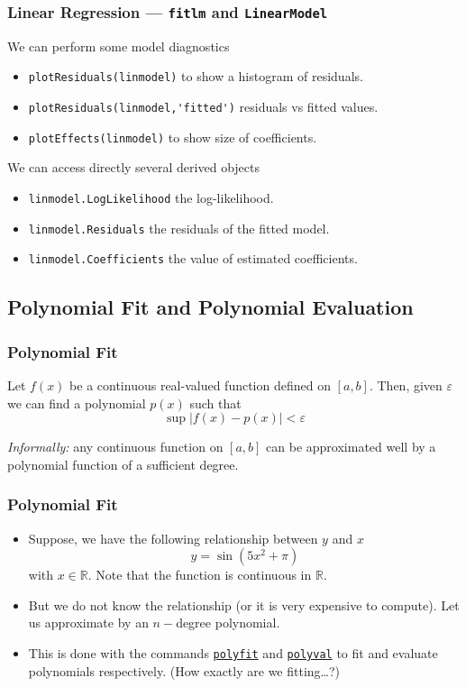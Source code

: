 \documentclass[11pt,xcolor={svgnames},aspectratio=169,usepdftitle=false]{beamer}
\begin{document}
\begin{frame}[fragile]
  \frametitle{Linear Regression --- \texttt{fitlm} and \texttt{LinearModel}}
We can perform some model diagnostics
\begin{itemize}
  \item \verb;plotResiduals(linmodel); to show a histogram of residuals.
  \item \verb;plotResiduals(linmodel,'fitted'); residuals vs fitted values.
  \item \verb;plotEffects(linmodel); to show size of coefficients.
\end{itemize}
We can access directly several derived objects
\begin{itemize}
  \item \verb;linmodel.LogLikelihood; the log-likelihood.
  \item \verb;linmodel.Residuals; the residuals of the fitted model.
  \item \verb;linmodel.Coefficients; the value of estimated coefficients.
\end{itemize}
\end{frame}

\subsection{Polynomial Fit and Polynomial Evaluation}

\begin{frame}
  \frametitle{Polynomial Fit}
\begin{theorem}
Let $f(x)$ be a continuous real-valued function defined on $[a,b]$. Then, given $\varepsilon$ we can find a polynomial $p(x)$ such that
\[
\sup \lvert f(x) - p(x) \rvert < \varepsilon  
\]
\end{theorem}
\textit{Informally:} any continuous function on $[a,b]$ can be approximated well by a polynomial function of a sufficient degree.
\end{frame}

\begin{frame}
  \frametitle{Polynomial Fit}
\begin{itemize}
  \item Suppose, we have the following relationship between $y$ and $x$
  \[
  y = \sin(5x^2 + \pi)
  \]
  with $x\in\mathbb{R}$. Note that the function is continuous in $\mathbb{R}$.
  \item But we do not know the relationship (or it is very expensive to compute). Let us approximate by an $n-$degree polynomial.
  \item This is done with the commands \href{https://www.mathworks.com/help/matlab/ref/polyfit.html}{\texttt{polyfit}} and \href{https://www.mathworks.com/help/matlab/ref/polyval.html}{\texttt{polyval}} to fit and evaluate polynomials respectively. \footnotesize (How exactly are we fitting\ldots ?)
\end{itemize}
\end{frame}
\end{document}
